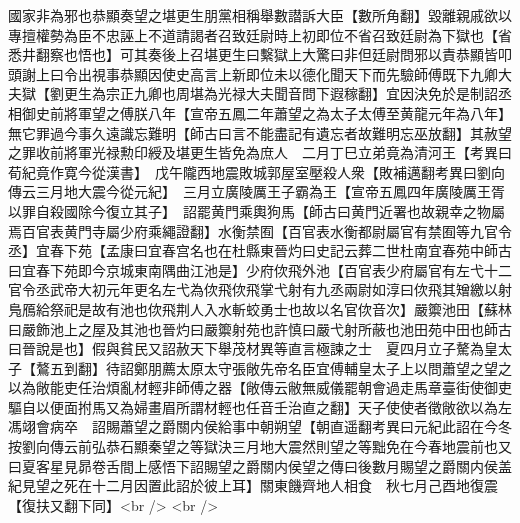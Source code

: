 國家非為邪也恭顯奏望之堪更生朋黨相稱舉數譛訴大臣【數所角翻】毀離親戚欲以專擅權勢為臣不忠誣上不道請謁者召致廷尉時上初即位不省召致廷尉為下獄也【省悉井翻察也悟也】可其奏後上召堪更生曰繫獄上大驚曰非但廷尉問邪以責恭顯皆叩頭謝上曰令出視事恭顯因使史高言上新即位未以德化聞天下而先驗師傅既下九卿大夫獄【劉更生為宗正九卿也周堪為光禄大夫聞音問下遐稼翻】宜因決免於是制詔丞相御史前將軍望之傅朕八年【宣帝五鳳二年蕭望之為太子太傅至黄龍元年為八年】無它罪過今事久遠識忘難明【師古曰言不能盡記有遺忘者故難明忘巫放翻】其赦望之罪收前將軍光禄勲印綬及堪更生皆免為庶人　二月丁巳立弟竟為清河王【考異曰荀紀竟作寛今從漢書】　戊午隴西地震敗城郭屋室壓殺人衆【敗補邁翻考異曰劉向傳云三月地大震今從元紀】　三月立廣陵厲王子霸為王【宣帝五鳳四年廣陵厲王胥以罪自殺國除今復立其子】　詔罷黄門乘輿狗馬【師古曰黄門近署也故親幸之物屬焉百官表黄門寺屬少府乘繩證翻】水衡禁囿【百官表水衡都尉屬官有禁囿等九官令丞】宜春下苑【孟康曰宜春宫名也在杜縣東晉灼曰史記云葬二世杜南宜春苑中師古曰宜春下苑即今京城東南隅曲江池是】少府佽飛外池【百官表少府屬官有左弋十二官令丞武帝大初元年更名左弋為佽飛佽飛掌弋射有九丞兩尉如淳曰佽飛其矰繳以射鳬鴈給祭祀是故有池也佽飛荆人入水斬蛟勇士也故以名官佽音次】嚴籞池田【蘇林曰嚴飾池上之屋及其池也晉灼曰嚴籞射苑也許慎曰嚴弋射所蔽也池田苑中田也師古曰晉說是也】假與貧民又詔赦天下舉茂材異等直言極諫之士　夏四月立子驁為皇太子【鷔五到翻】待詔鄭朋薦太原太守張敞先帝名臣宜傅輔皇太子上以問蕭望之望之以為敞能吏任治煩亂材輕非師傅之器【敞傳云敝無威儀罷朝會過走馬章臺街使御吏驅自以便面拊馬又為婦畫眉所謂材輕也任音壬治直之翻】天子使使者徵敞欲以為左馮翊會病卒　詔賜蕭望之爵關内侯給事中朝朔望【朝直遥翻考異曰元紀此詔在今冬按劉向傳云前弘恭石顯秦望之等獄決三月地大震然則望之等黜免在今春地震前也又曰夏客星見昴卷舌間上感悟下詔賜望之爵關内侯望之傳曰後數月賜望之爵關内侯盖紀見望之死在十二月因置此詔於彼上耳】關東饑齊地人相食　秋七月己酉地復震【復扶又翻下同】<br />
<br />

